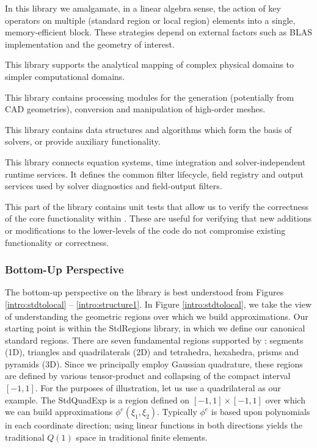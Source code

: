  In this library we amalgamate, in a linear algebra sense, the action of key operators on multiple 
(standard region or local region) elements into a single, memory-efficient block. These strategies depend on external
factors such as BLAS implementation and the geometry of interest. 

 This library supports the analytical mapping of complex physical domains to simpler computational domains.

 This library contains processing modules for the generation (potentially from CAD geometries), conversion and manipulation of high-order meshes.

 This library contains data structures and algorithms which form the basis of solvers, or provide auxiliary functionality.

 This library connects equation systems, time integration and solver-independent runtime services. It defines the common filter lifecycle, field registry and output services used by solver diagnostics and field-output filters.

 This part of the library contains unit tests that allow us to verify the correctness of the core functionality within {\nek}.  These are useful for verifying
that new additions or modifications to the lower-levels of the code do not compromise existing functionality or correctness.

\subsubsection{Bottom-Up Perspective}

The bottom-up perspective on the library is best understood from Figures \ref{intro:stdtolocal} -- \ref{intro:structure1}.  In Figure \ref{intro:stdtolocal}, we
take the view of understanding the geometric regions over which we build approximations.  Our starting point is within the StdRegions library, in which
we define our canonical standard regions.  There are seven fundamental regions supported by \nek{}:  segments (1D), triangles and quadrilaterals (2D) and tetrahedra, hexahedra,
prisms and pyramids (3D).  Since we principally employ Gaussian quadrature, these regions are defined by various tensor-product and collapsing of the
compact interval $[-1,1]$.  For the purposes of illustration, let us use a quadrilateral as our example.  The StdQuadExp is a region defined on $[-1,1] \times [-1,1]$
over which we can build approximations $\phi^e(\xi_1,\xi_2)$.  Typically $\phi^e$ is based upon polynomials in each coordinate direction; using linear functions
in both directions yields the traditional $Q(1)$ space in traditional finite elements.   

